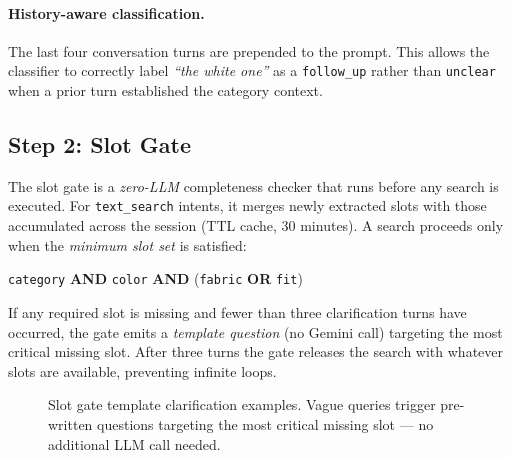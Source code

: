 \documentclass[12pt,a4paper]{article}
\begin{document}
\paragraph{History-aware classification.}
The last four conversation turns are prepended to the prompt.
This allows the classifier to correctly label
\textit{``the white one''} as a \texttt{follow\_up} rather than
\texttt{unclear} when a prior turn established the category context.

\subsection{Step 2: Slot Gate}

The slot gate is a \emph{zero-LLM} completeness checker that runs
before any search is executed.
For \texttt{text\_search} intents, it merges newly extracted slots
with those accumulated across the session (TTL cache, 30 minutes).
A search proceeds only when the \emph{minimum slot set} is satisfied:

\begin{center}
\texttt{category} \textbf{AND} \texttt{color} \textbf{AND}
(\texttt{fabric} \textbf{OR} \texttt{fit})
\end{center}

If any required slot is missing and fewer than three clarification
turns have occurred, the gate emits a \emph{template question}
(no Gemini call) targeting the most critical missing slot.
After three turns the gate releases the search with whatever slots
are available, preventing infinite loops.

\begin{figure}[H]
\centering
{}
\caption{Slot gate template clarification examples.
         Vague queries trigger pre-written questions targeting the
         most critical missing slot --- no additional LLM call needed.}
\label{fig:clarify}
\end{figure}
\end{document}
